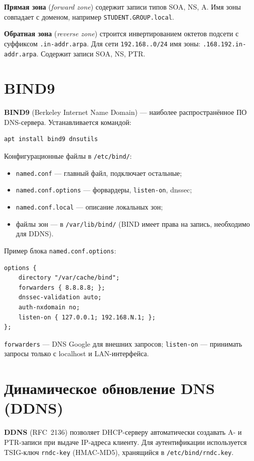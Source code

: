 \textbf{Прямая зона} (\textit{forward zone}) содержит записи типов SOA, NS, A.
Имя зоны совпадает с доменом, например \texttt{STUDENT.GROUP.local}.

\textbf{Обратная зона} (\textit{reverse zone}) строится инвертированием октетов
подсети с суффиксом \texttt{.in-addr.arpa}. Для сети
\texttt{192.168.\cfgLabStudentN.0/24} имя зоны:
\texttt{\cfgLabStudentN.168.192.in-addr.arpa}. Содержит записи SOA, NS, PTR.

\section{BIND9}

\textbf{BIND9} (Berkeley Internet Name Domain) — наиболее распространённое ПО
DNS-сервера. Устанавливается командой:
\begin{lstlisting}
apt install bind9 dnsutils
\end{lstlisting}

Конфигурационные файлы в \texttt{/etc/bind/}:
\begin{itemize}
  \item \texttt{named.conf} — главный файл, подключает остальные;
  \item \texttt{named.conf.options} — форвардеры, \texttt{listen-on}, dnssec;
  \item \texttt{named.conf.local} — описание локальных зон;
  \item файлы зон — в \texttt{/var/lib/bind/} (BIND имеет права на запись,
        необходимо для DDNS).
\end{itemize}

Пример блока \texttt{named.conf.options}:
\begin{lstlisting}
options {
    directory "/var/cache/bind";
    forwarders { 8.8.8.8; };
    dnssec-validation auto;
    auth-nxdomain no;
    listen-on { 127.0.0.1; 192.168.N.1; };
};
\end{lstlisting}

\texttt{forwarders} — DNS Google для внешних запросов; \texttt{listen-on} —
принимать запросы только с localhost и LAN-интерфейса.

\section{Динамическое обновление DNS (DDNS)}

\textbf{DDNS} (RFC~2136) позволяет DHCP-серверу автоматически создавать
A- и PTR-записи при выдаче IP-адреса клиенту. Для аутентификации используется
TSIG-ключ \texttt{rndc-key} (HMAC-MD5), хранящийся в \texttt{/etc/bind/rndc.key}.

